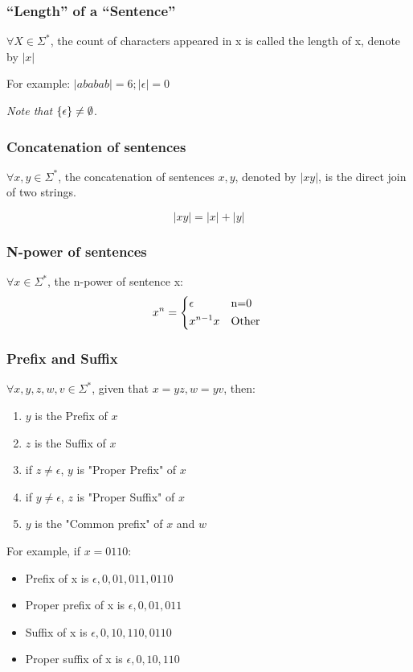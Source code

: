 \documentclass{ctexart}
\DeclarePairedDelimiter{\set}{\{}{\}}
\begin{document}
\subsubsection{``Length'' of a ``Sentence''}

$\forall X \in \Sigma^*$, the count of characters appeared in x is called the length of x, denote by $\left|x\right|$

For example: $\left|ababab\right| = 6; \left|\epsilon\right| = 0$ 

\emph{Note that $\set*{\epsilon} \neq \emptyset$}.

\subsubsection{Concatenation of sentences}
$\forall x, y \in \Sigma^*$, the concatenation of sentences $x, y$, denoted by $|xy|$, is the direct join of two strings.

$$
\left|xy\right| = |x| + |y|
$$

\subsubsection{N-power of sentences}
$\forall x \in \Sigma^*$, the n-power of sentence x:
$$
x^n = \begin{dcases*}
\epsilon & n=0 \\
x^{n-1}x & Other \\
\end{dcases*}
$$

\subsubsection{Prefix and Suffix}
$\forall x,y,z,w,v \in \Sigma^*$, given that $x=yz, w=yv$, then:
\begin{enumerate}
	\item $y$ is the Prefix of $x$
	\item $z$ is the Suffix of $x$
	\item if $z \neq \epsilon$, $y$ is "Proper Prefix" of $x$
	\item if $y \neq \epsilon$, $z$ is "Proper Suffix" of $x$
	\item $y$ is the "Common prefix" of $x$ and $w$
\end{enumerate}
For example, if $x = 0110$:
\begin{itemize}
	\item Prefix of x is $\epsilon, 0, 01, 011, 0110$
	\item Proper prefix of x is $\epsilon, 0, 01, 011$
	\item Suffix of x is $\epsilon, 0, 10, 110, 0110$
	\item Proper suffix of x is $\epsilon, 0, 10, 110$
\end{itemize}
\end{document}
